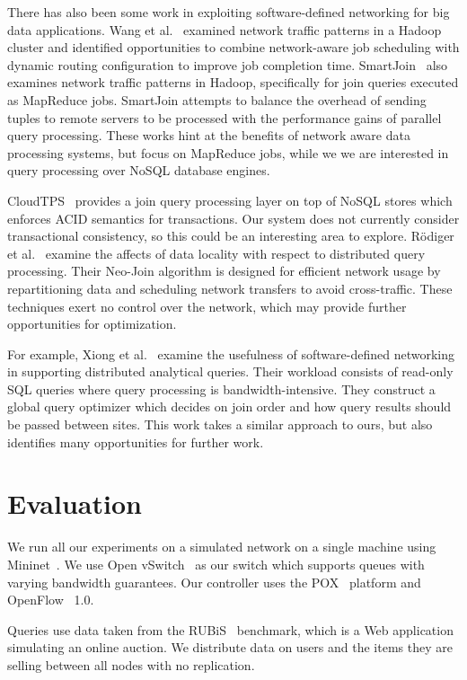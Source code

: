 \documentclass{sig-alternate-2013}
\begin{document}
There has also been some work in exploiting software-defined networking for big data applications.
Wang et al.~\cite{Wang2012} examined network traffic patterns in a Hadoop~\cite{Shvachko2010} cluster and identified opportunities to combine network-aware job scheduling with dynamic routing configuration to improve job completion time.
SmartJoin~\cite{Slagter2014} also examines network traffic patterns in Hadoop, specifically for join queries executed as MapReduce jobs.
SmartJoin attempts to balance the overhead of sending tuples to remote servers to be processed with the performance gains of parallel query processing.
These works hint at the benefits of network aware data processing systems, but focus on MapReduce jobs, while we we are interested in query processing over NoSQL database engines.

CloudTPS~\cite{Wei2012} provides a join query processing layer on top of NoSQL stores which enforces ACID semantics for transactions.
Our system does not currently consider transactional consistency, so this could be an interesting area to explore.
R\"{o}diger et al.~\cite{Rodiger2014} examine the affects of data locality with respect to distributed query processing.
Their Neo-Join algorithm is designed for efficient network usage by repartitioning data and scheduling network transfers to avoid cross-traffic.
These techniques exert no control over the network, which may provide further opportunities for optimization.

For example, Xiong et al.~\cite{Xiong2014} examine the usefulness of software-defined networking in supporting distributed analytical queries.
Their workload consists of read-only SQL queries where query processing is bandwidth-intensive.
They construct a global query optimizer which decides on join order and how query results should be passed between sites.
This work takes a similar approach to ours, but also identifies many opportunities for further work.

\section{Evaluation}

We run all our experiments on a simulated network on a single machine using Mininet~\cite{Lantz2010}.
We use Open vSwitch~\cite{Pfaff2009} as our switch which supports queues with varying bandwidth guarantees.
Our controller uses the POX~\cite{Gude2008} platform and OpenFlow~\cite{McKeown2008} 1.0.

Queries use data taken from the RUBiS~\cite{Cecchet2002} benchmark, which is a Web application simulating an online auction.
We distribute data on users and the items they are selling between all nodes with no replication.
\end{document}
